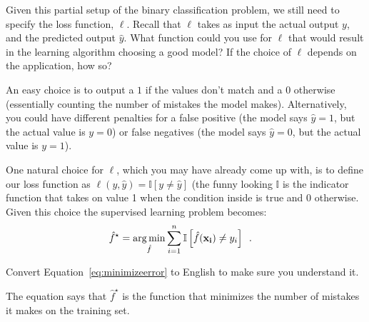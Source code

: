 \documentclass[assignment03_Solutions]{subfiles}
\begin{document}
\vspace{1em}
\begin{exercise}[(10 minutes)]
\bes
\item Given this partial setup of the binary classification problem, we still need to specify the loss function, $\ell$.  Recall that $\ell$ takes as input the actual output $y$, and the predicted output $\hat{y}$.  What function could you use for $\ell$ that would result in the learning algorithm choosing a good model?  If the choice of $\ell$ depends on the application, how so?

\begin{boxedsolution}
An easy choice is to output a $1$ if the values don't match and a $0$ otherwise (essentially counting the number of mistakes the model makes).  Alternatively, you could have different penalties for a false positive (the model says $\hat{y} = 1$, but the actual value is $y = 0$) or false negatives (the model says $\hat{y} = 0$, but the actual value is $y = 1$). 
\end{boxedsolution}

\item \label{ex:minmistakes}
One natural choice for $\ell$, which you may have already come up with, is to define our loss function as $\ell(y, \hat{y}) = \mathbb{I}[y \neq \hat{y}]$ (the funny looking $\mathbb{I}$ is the indicator function that takes on value 1 when the condition inside is true and 0 otherwise.  Given this choice the supervised learning problem becomes:
\begin{align}
\hat{f}^\star &= \operatorname*{arg\,min}_{\hat{f}} \sum_{i=1}^n \mathbb{I} \left [  \hat{f}(\mathbf{x_i}) \neq y_i\right ] \enspace . \label{eq:minimizeerror}
\end{align}

Convert Equation~\ref{eq:minimizeerror} to English to make sure you understand it.
\begin{boxedsolution}
The equation says that $\hat{f}^\star$ is the function that minimizes the number of mistakes it makes on the training set.
\end{boxedsolution}

\ees

\end{exercise}
\end{document}
